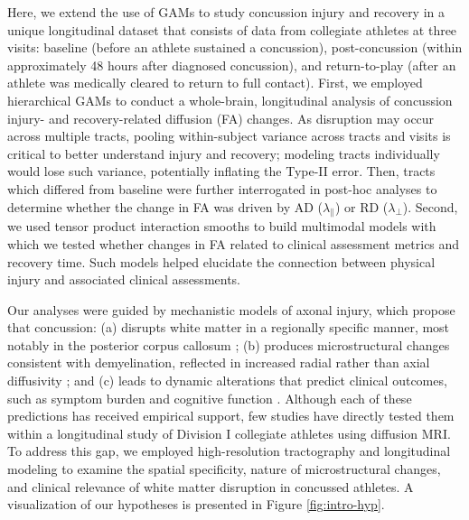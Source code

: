 \documentclass[]{imag-ms-template}
\begin{document}
Here, we extend the use of GAMs to study concussion injury and recovery in a unique longitudinal dataset that consists of data from collegiate athletes at three visits: baseline (before an athlete sustained a concussion), post-concussion (within approximately 48 hours after diagnosed concussion), and return-to-play (after an athlete was medically cleared to return to full contact). First, we employed hierarchical GAMs to conduct a whole-brain, longitudinal analysis of concussion injury- and recovery-related diffusion (FA) changes. As disruption may occur across multiple tracts, pooling within-subject variance across tracts and visits is critical to better understand injury and recovery; modeling tracts individually would lose such variance, potentially inflating the Type-II error. Then, tracts which differed from baseline were further interrogated in post-hoc analyses to determine whether the change in FA was driven by AD ($\lambda_\parallel$) or RD ($\lambda_\perp$). Second, we used tensor product interaction smooths to build multimodal models with which we tested whether changes in FA related to clinical assessment metrics and recovery time. Such models helped elucidate the connection between physical injury and associated clinical assessments.

Our analyses were guided by mechanistic models of axonal injury, which propose that concussion: (a) disrupts white matter in a regionally specific manner, most notably in the posterior corpus callosum \parencite{jang2020DiagnosticProblemsDiffuse,johnson2013AxonalPathologyTraumatic,lindsey2023DiffusionWeightedImagingMild,meythaler2001CurrentConceptsDiffuse}; (b) produces microstructural changes consistent with demyelination, reflected in increased radial rather than axial diffusivity \parencite{mayer2017SpectrumMildTraumatic,borja2018DiffusionMRImaging}; and (c) leads to dynamic alterations that predict clinical outcomes, such as symptom burden and cognitive function \parencite{marmarou2007IMPACTDatabaseTraumatic,maas2013AdvancingCareTraumatic,schatz2013SensitivitySpecificityOnline}. Although each of these predictions has received empirical support, few studies have directly tested them within a longitudinal study of Division I collegiate athletes using diffusion MRI. To address this gap, we employed high-resolution tractography and longitudinal modeling to examine the spatial specificity, nature of microstructural changes, and clinical relevance of white matter disruption in concussed athletes. A visualization of our hypotheses is presented in Figure \ref{fig:intro-hyp}.
\end{document}
